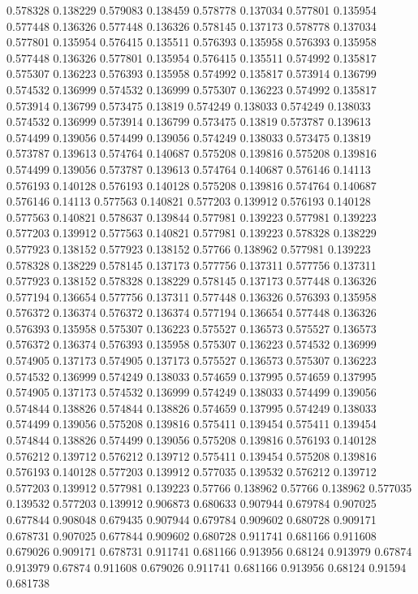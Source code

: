 0.578328 0.138229
0.579083 0.138459
0.578778 0.137034
0.577801 0.135954
0.577448 0.136326
0.577448 0.136326
0.578145 0.137173
0.578778 0.137034
0.577801 0.135954
0.576415 0.135511
0.576393 0.135958
0.576393 0.135958
0.577448 0.136326
0.577801 0.135954
0.576415 0.135511
0.574992 0.135817
0.575307 0.136223
0.576393 0.135958
0.574992 0.135817
0.573914 0.136799
0.574532 0.136999
0.574532 0.136999
0.575307 0.136223
0.574992 0.135817
0.573914 0.136799
0.573475 0.13819
0.574249 0.138033
0.574249 0.138033
0.574532 0.136999
0.573914 0.136799
0.573475 0.13819
0.573787 0.139613
0.574499 0.139056
0.574499 0.139056
0.574249 0.138033
0.573475 0.13819
0.573787 0.139613
0.574764 0.140687
0.575208 0.139816
0.575208 0.139816
0.574499 0.139056
0.573787 0.139613
0.574764 0.140687
0.576146 0.14113
0.576193 0.140128
0.576193 0.140128
0.575208 0.139816
0.574764 0.140687
0.576146 0.14113
0.577563 0.140821
0.577203 0.139912
0.576193 0.140128
0.577563 0.140821
0.578637 0.139844
0.577981 0.139223
0.577981 0.139223
0.577203 0.139912
0.577563 0.140821
0.577981 0.139223
0.578328 0.138229
0.577923 0.138152
0.577923 0.138152
0.57766 0.138962
0.577981 0.139223
0.578328 0.138229
0.578145 0.137173
0.577756 0.137311
0.577756 0.137311
0.577923 0.138152
0.578328 0.138229
0.578145 0.137173
0.577448 0.136326
0.577194 0.136654
0.577756 0.137311
0.577448 0.136326
0.576393 0.135958
0.576372 0.136374
0.576372 0.136374
0.577194 0.136654
0.577448 0.136326
0.576393 0.135958
0.575307 0.136223
0.575527 0.136573
0.575527 0.136573
0.576372 0.136374
0.576393 0.135958
0.575307 0.136223
0.574532 0.136999
0.574905 0.137173
0.574905 0.137173
0.575527 0.136573
0.575307 0.136223
0.574532 0.136999
0.574249 0.138033
0.574659 0.137995
0.574659 0.137995
0.574905 0.137173
0.574532 0.136999
0.574249 0.138033
0.574499 0.139056
0.574844 0.138826
0.574844 0.138826
0.574659 0.137995
0.574249 0.138033
0.574499 0.139056
0.575208 0.139816
0.575411 0.139454
0.575411 0.139454
0.574844 0.138826
0.574499 0.139056
0.575208 0.139816
0.576193 0.140128
0.576212 0.139712
0.576212 0.139712
0.575411 0.139454
0.575208 0.139816
0.576193 0.140128
0.577203 0.139912
0.577035 0.139532
0.576212 0.139712
0.577203 0.139912
0.577981 0.139223
0.57766 0.138962
0.57766 0.138962
0.577035 0.139532
0.577203 0.139912
0.906873 0.680633
0.907944 0.679784
0.907025 0.677844
0.908048 0.679435
0.907944 0.679784
0.909602 0.680728
0.909171 0.678731
0.907025 0.677844
0.909602 0.680728
0.911741 0.681166
0.911608 0.679026
0.909171 0.678731
0.911741 0.681166
0.913956 0.68124
0.913979 0.67874
0.913979 0.67874
0.911608 0.679026
0.911741 0.681166
0.913956 0.68124
0.91594 0.681738
